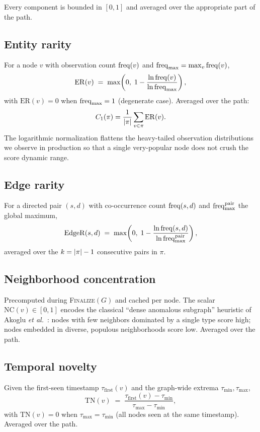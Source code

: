 \documentclass[11pt,openany]{book}
\begin{document}
Every component is bounded in $[0, 1]$ and averaged over the
appropriate part of the path.

\subsection{Entity rarity}
\label{sec:scoring:er}

For a node $v$ with observation count $\operatorname{freq}(v)$ and
$\operatorname{freq}_{\max} = \max_v \operatorname{freq}(v)$,
\[
\mathrm{ER}(v) \;=\; \max\!\left(0, \; 1 - \frac{\ln \operatorname{freq}(v)}{\ln \operatorname{freq}_{\max}}\right),
\]
with $\mathrm{ER}(v) = 0$ when $\operatorname{freq}_{\max} = 1$ (degenerate case).
Averaged over the path:
\[
C_1(\pi) = \frac{1}{\lvert \pi \rvert} \sum_{v \in \pi} \mathrm{ER}(v).
\]
The logarithmic normalization flattens the heavy-tailed observation
distributions we observe in production so that a single very-popular
node does not crush the score dynamic range.

\subsection{Edge rarity}
\label{sec:scoring:edger}

For a directed pair $(s, d)$ with co-occurrence count
$\operatorname{freq}(s, d)$ and $\operatorname{freq}^{\mathrm{pair}}_{\max}$ the global maximum,
\[
\mathrm{EdgeR}(s, d) \;=\; \max\!\left(0, \; 1 - \frac{\ln \operatorname{freq}(s, d)}{\ln \operatorname{freq}^{\mathrm{pair}}_{\max}}\right),
\]
averaged over the $k = \lvert \pi \rvert - 1$ consecutive pairs in $\pi$.

\subsection{Neighborhood concentration}
\label{sec:scoring:nc}

Precomputed during \textsc{Finalize}$(G)$ and cached per node. The
scalar $\mathrm{NC}(v) \in [0, 1]$ encodes the classical ``dense
anomalous subgraph'' heuristic of Akoglu \emph{et al.}~\cite{akoglu}:
nodes with few neighbors dominated by a single type score high;
nodes embedded in diverse, populous neighborhoods score low.
Averaged over the path.

\subsection{Temporal novelty}
\label{sec:scoring:tn}

Given the first-seen timestamp $\tau_{\mathrm{first}}(v)$ and the
graph-wide extrema $\tau_{\min}, \tau_{\max}$,
\[
\mathrm{TN}(v) \;=\; \frac{\tau_{\mathrm{first}}(v) - \tau_{\min}}{\tau_{\max} - \tau_{\min}},
\]
with $\mathrm{TN}(v) = 0$ when $\tau_{\max} = \tau_{\min}$ (all
nodes seen at the same timestamp). Averaged over the path.
\end{document}
